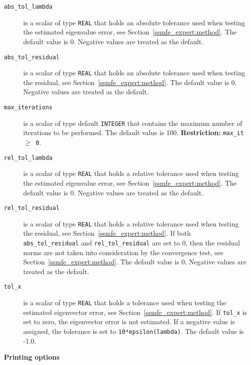 \begin{description}
%
\item[\texttt{abs\_tol\_lambda}] is a scalar of type
\texttt{REAL} that
holds an absolute tolerance used when testing the estimated eigenvalue 
error, see Section~\ref{ssmfe_expert:method}. 
The default value is 0. %
Negative values are treated as the default.
%
\item[\texttt{abs\_tol\_residual}] is a scalar of type
\texttt{REAL} that
holds an absolute tolerance used when testing the residual, 
see Section~\ref{ssmfe_expert:method}.
The default value is 0.
Negative values are treated as the default.
%
\item[\texttt{max\_iterations}] is a scalar of type default \texttt{INTEGER} that
contains the maximum number of iterations to be performed.
The default value is 100.
{\bf Restriction:} {\tt max\_it $\ge$ 0}.
%
\item[\texttt{rel\_tol\_lambda}] is a scalar of type
\texttt{REAL} that
holds a relative tolerance used when testing the estimated eigenvalue 
error, see Section~\ref{ssmfe_expert:method}. 
The default value is 0.
Negative values are treated as the default.
%
\item[\texttt{rel\_tol\_residual}] is a scalar of type
\texttt{REAL} that
holds a relative tolerance used when testing the residual,
see Section~\ref{ssmfe_expert:method}. 
If both {\tt abs\_tol\_residual} and {\tt rel\_tol\_residual}
are set to 0, then the residual norms are not taken
into consideration by the convergence test,
see Section~\ref{ssmfe_expert:method}.
The default value is 0.
Negative values are treated as the default.
%
\item[\texttt{tol\_x}] is a scalar of type \texttt{REAL} that
holds a tolerance used when testing the estimated 
eigenvector error, see Section~\ref{ssmfe_expert:method}. 
If {\tt tol\_x} is set to zero, the eigenvector error is not estimated.
If a negative value is assigned, the tolerance is set to
{\tt 10*epsilon(lambda)}.
The default value is -1.0.
%
\end{description}

\medskip
\noindent
{\bf Printing options}

